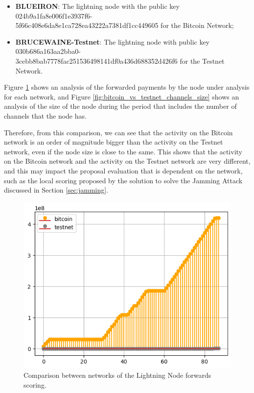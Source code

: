 \begin{itemize}
    \item {\bf BLUEIRON}: The lightning node with the public key 024b9a1fa8e006f1e3937f6-\\5f66c408e6da8e1ca728ea43222a7381df1cc449605 for the Bitcoin Network;
    \item {\bf BRUCEWAINE-Testnet}: The lightning node with public key 030b686a163aa2bba0-\\3cebb8bab7778fac251536498141df0a436d688352d426f6 for the Testnet Network.
\end{itemize}

Figure \ref{fig:bitcoin_vs_testnet_forwards} shows an analysis of the forwarded 
payments by the node under analysis for each network, and Figure \ref{fig:bitcoin_vs_testnet_channels_size} 
shows an analysis of the size of the node during the period that includes the number
of channels that the node has.

Therefore, from this comparison, we can see that the activity on the Bitcoin network is an order of magnitude
bigger than the activity on the Testnet network, even if the node size is close to the same. This 
shows that the activity on the Bitcoin network and the activity on the Testnet network are very different,
and this may impact the proposal evaluation that is dependent on the network, such as the local scoring 
proposed by the solution to solve the Jamming Attack discussed in Section \ref{sec:jamming}.

\begin{figure}[H]
    \begin{center}
        \includegraphics[scale=0.7]{imgs/bitcoin_vs_testnet_forwards.png}
    \end{center}
    \caption{Comparison between networks of the Lightning Node forwards scoring.}
    \label{fig:bitcoin_vs_testnet_forwards}
\end{figure}

